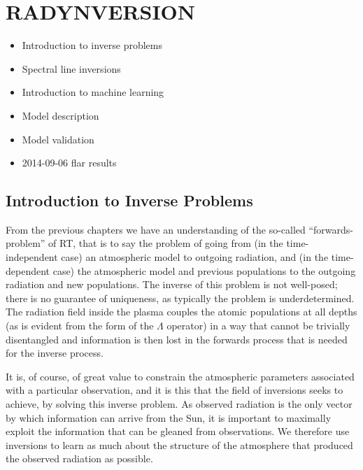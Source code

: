 \chapter{RADYNVERSION}\label{Chap:Radynversion}

\begin{itemize}
    \item Introduction to inverse problems
    \item Spectral line inversions
    \item Introduction to machine learning
    \item Model description
    \item Model validation
    \item 2014-09-06 flar results
\end{itemize}

\section{Introduction to Inverse Problems}

From the previous chapters we have an understanding of the so-called ``forwards-problem'' of RT, that is to say the problem of going from (in the time-independent case) an atmospheric model to outgoing radiation, and (in the time-dependent case) the atmospheric model and previous populations to the outgoing radiation and new populations.
The inverse of this problem is not well-posed; there is no guarantee of uniqueness, as typically the problem is underdetermined.
The radiation field inside the plasma couples the atomic populations at all depths (as is evident from the form of the $\Lambda$ operator) in a way that cannot be trivially disentangled and information is then lost in the forwards process that is needed for the inverse process.

It is, of course, of great value to constrain the atmospheric parameters associated with a particular observation, and it is this that the field of inversions seeks to achieve, by solving this inverse problem. As observed radiation is the only vector by which information can arrive from the Sun, it is important to maximally exploit the information that can be gleaned from observations. We therefore use inversions to learn as much about the structure of the atmosphere that produced the observed radiation as possible.


